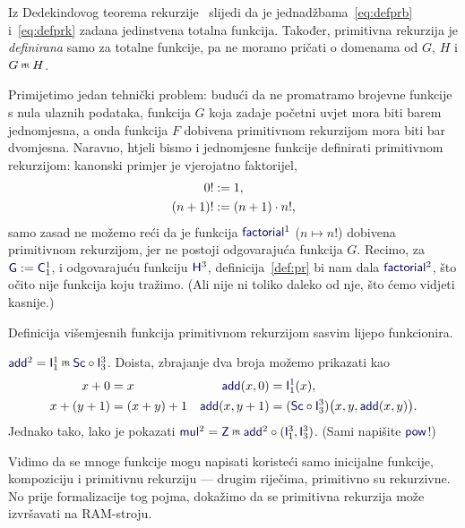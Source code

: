\begin{napomena}\label{nap:prtot}
Iz Dedekindovog teorema rekurzije~\cite{skr:VukTS} slijedi da je jednadžbama~\eqref{eq:defprb} i~\eqref{eq:defprk} zadana jedinstvena totalna funkcija. Također, primitivna rekurzija je \emph{definirana} samo za totalne funkcije, pa ne moramo pričati o domenama od $G$, $H$ i $G\pr H$.
\end{napomena}

Primijetimo jedan tehnički problem: budući da ne promatramo brojevne funkcije s nula ulaznih podataka, funkcija $G$ koja zadaje početni uvjet mora biti barem jednomjesna, a onda funkcija $F$ dobivena primitivnom rekurzijom mora biti bar dvomjesna. Naravno, htjeli bismo i jednomjesne funkcije definirati primitivnom rekurzijom: kanonski primjer je vjerojatno faktorijel,
\begin{align}
\label{eq:faktb}
    0!&:=1\text,\\
\label{eq:faktk}
    (n+1)!&:=(n+1)\cdot n!\text,
\end{align}
samo zasad ne možemo reći da je funkcija $\f{factorial}^1$ ($n\mapsto n!$) dobivena primitivnom rekurzijom, jer ne postoji odgovarajuća funkcija $G$. Recimo, za $\f G:=\f C_1^1$, i odgovarajuću funkciju $\f H^3$, definicija~\ref{def:pr} bi nam dala $\f{factorial}^2$, što očito nije funkcija koju tražimo. (Ali nije ni toliko daleko od nje, što ćemo vidjeti kasnije.)

Definicija višemjesnih funkcija primitivnom rekurzijom sasvim lijepo funkcionira.

\begin{primjer}\label{pr:addmulpow}
$\f{add}^2=\f I_1^1\pr\f{Sc}\circ\f I_3^3$. Doista, zbrajanje dva broja možemo prikazati kao
\begin{align}
\label{eq:addb}
    x+0&=x & \f{add}(x,0)&=\f I_1^1(x),\\
\label{eq:addk}
    x+(y+1)&=(x+y)+1 &\f{add}(x,y+1)&=(\f{Sc}\circ\f I_3^3)\bigl(x,y,\f{add}(x,y)\bigr).
\end{align}
Jednako tako, lako je pokazati $\f{mul}^2=\f Z\pr\f{add}^2\circ(\f I_1^3,\f I_3^3)$. (Sami napišite $\f{pow}$!)
\end{primjer}

Vidimo da se mnoge funkcije mogu napisati koristeći samo inicijalne funkcije, kompoziciju i primitivnu rekurziju --- drugim riječima, primitivno su rekurzivne. No prije formalizacije tog pojma, dokažimo da se primitivna rekurzija može izvršavati na RAM-stroju.

